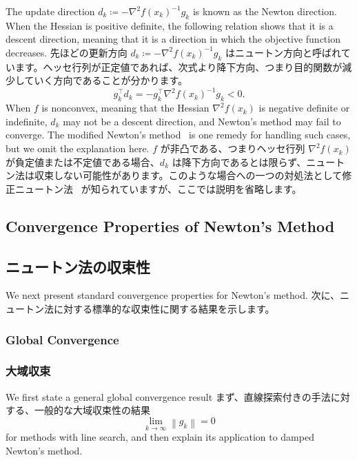 \documentclass[0_main]{subfiles}
\begin{document}
\ifEn
    The update direction $d_k \coloneqq -\nabla^2 f(x_k)^{-1} g_k$ is known as the Newton direction.
    When the Hessian is positive definite, the following relation shows that it is a descent direction, meaning that it is a direction in which the objective function decreases.
\else
    先ほどの更新方向 $d_k \coloneqq -\nabla^2 f(x_k)^{-1} g_k$ はニュートン方向と呼ばれています。ヘッセ行列が正定値であれば、次式より降下方向、つまり目的関数が減少していく方向であることが分かります。
\fi
\begin{equation*}
    g_k^\top d_k = -g_k^\top \nabla^2 f(x_k)^{-1} g_k < 0.
\end{equation*}
\ifEn
    When $f$ is nonconvex, meaning that the Hessian $\nabla^2 f(x_k)$ is negative definite or indefinite, $d_k$ may not be a descent direction, and Newton's method may fail to converge. The modified Newton's method~\citep[Sec. 3.4]{nocedal1999numerical} is one remedy for handling such cases, but we omit the explanation here.
\else
    $f$ が非凸である、つまりヘッセ行列 $\nabla^2 f(x_k)$ が負定値または不定値である場合、$d_k$ は降下方向であるとは限らず、ニュートン法は収束しない可能性があります。このような場合への一つの対処法として修正ニュートン法~\citep[Sec. 3.4]{nocedal1999numerical} が知られていますが、ここでは説明を省略します。
\fi

\ifEn
    \subsection{Convergence Properties of Newton's Method}
\else
    \subsection{ニュートン法の収束性}
\fi
\label{sec:newton-convergence}

\ifEn
    We next present standard convergence properties for Newton's method.
\else
    次に、ニュートン法に対する標準的な収束性に関する結果を示します。
\fi

\ifEn
    \subsubsection{Global Convergence}
\else
    \subsubsection{大域収束}
\fi

\ifEn
    We first state a general global convergence result
\else
    まず、直線探索付きの手法に対する、一般的な大域収束性の結果
\fi
\begin{equation*}
    \lim_{k \to \infty} \left\lVert g_k \right\rVert = 0
\end{equation*}
\ifEn
    for methods with line search, and then explain its application to damped Newton's method.
\end{document}
